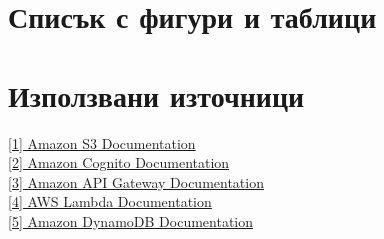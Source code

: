 \documentclass[12pt]{article}
\begin{document}
\newpage
 

\section{Списък с фигури и таблици}

\listoftables

\listoffigures

\medskip


\section{Използвани източници}
\noindent\href{https://aws.amazon.com/s3/}{[1] Amazon S3 Documentation}\\
\noindent\href{https://aws.amazon.com/cognito/}{[2] Amazon Cognito Documentation}\\
\noindent\href{https://aws.amazon.com/api-gateway/}{[3] Amazon API Gateway Documentation}\\
\noindent\href{https://aws.amazon.com/lambda/}{[4] AWS Lambda Documentation}\\
\noindent\href{https://aws.amazon.com/dynamodb/}{[5] Amazon DynamoDB Documentation}

\biskip
\end{document}
